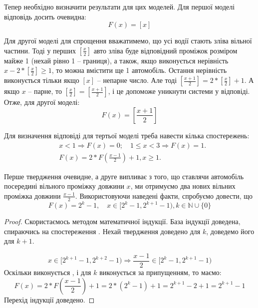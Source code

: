 Тепер необхідно визначити результати для цих моделей. Для першої моделі відповідь досить очевидна:
\begin{equation}
	\label{eq:upperbound}
	F(x)=[x]
\end{equation}

Для другої моделі для спрощення вважатимемо, що усі водії стають зліва вільної частини. Тоді у перших $[\frac x2]$ авто зліва буде відповідний проміжок розміром майже 1 (нехай рівно 1 – границя), а також, якщо виконується нерівність $x - 2 * [\frac x2] \geq 1$, то можна вмістити ще 1 автомобіль. Остання нерівність виконується тільки якщо $[x]$ – непарне число. Але тоді $[\frac{x+1}{2}] = 2 * [\frac{x}{2}] + 1$. А якщо $x$ – парне, то $[\frac{x}{2}] = [\frac{x+1}{2}]$, і це допоможе уникнути системи у відповіді. Отже, для другої моделі:
\begin{equation}
	\label{eq:lowerbound}
	F(x)=\left[\frac{x+1}{2}\right]
\end{equation}

Для визначення відповіді для тертьої моделі треба навести кілька спостережень:
\begin{align}
	&x < 1 \Rightarrow F(x)=0;\quad 1 \leq x < 3 \Rightarrow F(x) = 1.\label{eq:part_case_prop1}\\
	&F(x) = 2 * F\left(\frac{x-1}{2}\right) + 1, x \geq 1.\label{eq:part_case_prop2}
\end{align}

Перше твердження очевидне, а друге випливає з того, що ставлячи автомобіль посередині вільного проміжку довжини $x$, ми отримуємо два
нових вільних проміжка довжини $\frac{x-1}{2}$. Використовуючи наведені факти,
спробуємо довести, що
\begin{equation}
	F(x) = 2^k - 1,\quad x \in [2^k - 1, 2^{k+1} - 1), k \in \mathbb{N} \cup \{0\} \label{eq:part_case_res3}
\end{equation}

\begin{proof}
	Скористаємось методом математичної індукції. База індукції доведена, спираючись на спостереження . Нехай твердження доведено для $k$, доведемо його для $k+1$.
	
	\begin{equation}
		x \in [2^{k+1} - 1, 2^{k+2} - 1) \Rightarrow \frac{x-1}{2} \in [2^k - 1, 2^{k+1} - 1)
	\end{equation}
	Оскільки виконується , і для $k$ виконується  за припущенням, то маємо:
	\begin{equation}
		F(x) = 2 * F\left(\frac{x-1}{2}\right) + 1 = 2 * (2^k - 1) + 1 = 2^{k+1} - 2 + 1 = 2^{k+1} - 1
	\end{equation}
	Перехід індукції доведено.
\end{proof}